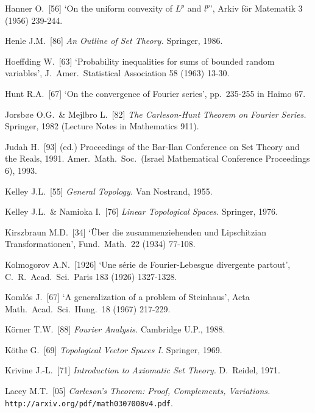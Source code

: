 {Hanner O.\ [56] `On the uniform convexity of $L^p$ and $l^p$',
Arkiv f\"or Matematik 3 (1956) 239-244.
\cmmnt{[244O.]}

Henle J.M.\ [86] {\it An Outline of Set Theory.}  Springer, 1986.
\cmmnt{[\S2A1.]}

Hoeffding W.\ [63]
`Probability inequalities for sums of bounded random variables',
J.\ Amer.\ Statistical Association 58 (1963) 13-30.
\cmmnt{[272W.]}

Hunt R.A.\ [67] `On the convergence of Fourier series', pp.\ 235-255
in {\smc Haimo 67}.  \cmmnt{[\S286 {\it notes}.]}

\medskip%

Jorsb{\o}e O.G.\ \& Mejlbro L.\ [82] {\it The Carleson-Hunt Theorem on
Fourier Series.}  Springer, 1982 (Lecture Notes in Mathematics 911).
\cmmnt{[\S286 {\it notes}.]}

Judah H.\ [93] (ed.) {Proceedings of the Bar-Ilan Conference on Set
Theory and the Reals, 1991.} Amer.\ Math.\ Soc.\ (Israel Mathematical
Conference Proceedings 6), 1993.

\medskip%

Kelley J.L.\ [55] {\it General Topology.} Van Nostrand, 1955.
\cmmnt{[2A5F.]}

Kelley J.L.\ \& Namioka I.\ [76] {\it Linear Topological Spaces.}
Springer, 1976.   \cmmnt{[2A5C.]}

Kirszbraun M.D.\ [34] `\"Uber die zusammenziehenden und Lipschitzian
Transformationen', Fund.\ Math.\ 22 (1934) 77-108.  \cmmnt{[262C.]}

Kolmogorov A.N.\ [1926] `Une s\'erie de Fourier-Lebesgue divergente
partout', C.\ R.\ Acad.\ Sci.\ Paris 183 (1926) 1327-1328.
\cmmnt{[\S282 {\it notes}.]}

Koml\'os J.\ [67] `A generalization of a problem of Steinhaus', Acta
Math.\ Acad.\ Sci.\ Hung.\ 18 (1967) 217-229.  \cmmnt{[276H.]}

K\"orner T.W.\ [88] {\it Fourier Analysis.}  Cambridge U.P., 1988.
\cmmnt{[\S282 {\it notes}.]}

K\"othe G.\ [69] {\it Topological Vector Spaces I.}   Springer, 1969.
\cmmnt{[2A5C, 2A5E, 2A5J.]}

Krivine J.-L.\ [71] {\it Introduction to Axiomatic Set Theory.}
D.~Reidel, 1971.  \cmmnt{[\S2A1.]}

\medskip%

Lacey M.T.\ [05] {\it Carleson's Theorem: Proof, Complements, Variations.}
{\tt http://arxiv.org/pdf/math{\bsp}0307008v4{}.pdf}.
\cmmnt{[\S286 {\it notes}.]}

}
